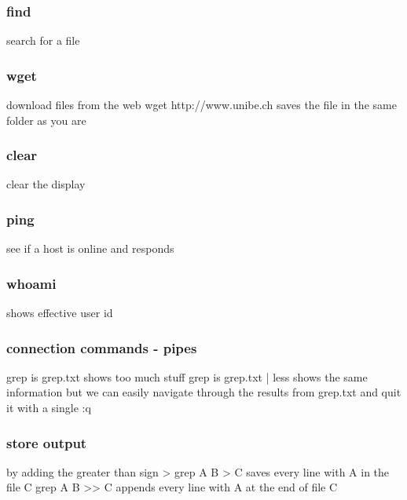 \documentclass[10pt,a4paper]{scrartcl}
\begin{document}
\begin{description}
\subsubsection{find}
\begin{terminalcode}
search for a file
\end{terminalcode}

\subsubsection{wget}
\begin{terminalcode}
download files from the web
wget http://www.unibe.ch
saves the file in the same folder as you are
\end{terminalcode}

\subsubsection{clear}
\begin{terminalcode}
clear the display
\end{terminalcode}

\subsubsection{ping}
\begin{terminalcode}
see if a host is online and responds
\end{terminalcode}

\subsubsection{whoami}
\begin{terminalcode}
shows effective user id
\end{terminalcode}

\subsubsection{connection commands - pipes}
\begin{terminalcode}grep is grep.txt shows too much stuff
grep is grep.txt | less shows the same information but
we can easily navigate through the results from grep.txt
and quit it with a single :q
\end{terminalcode}

\subsubsection{store output}
\begin{terminalcode}by adding the greater than sign >
grep A B > C saves every line with A in the file C
grep A B >> C appends every line with A at the end of file C
\end{terminalcode}


\end{description}
\end{document}
